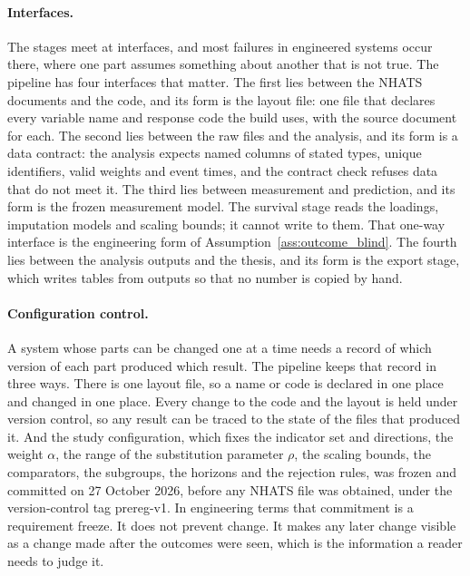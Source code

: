 \paragraph{Interfaces.} The stages meet at interfaces, and most failures in
engineered systems occur there, where one part assumes something about
another that is not true. The pipeline has four interfaces that matter. The
first lies between the NHATS documents and the code, and its form is the
layout file: one file that declares every variable name and response code the
build uses, with the source document for each. The second lies between the
raw files and the analysis, and its form is a data contract: the analysis
expects named columns of stated types, unique identifiers, valid weights and
event times, and the contract check refuses data that do not meet it. The
third lies between measurement and prediction, and its form is the frozen
measurement model. The survival stage reads the loadings, imputation models
and scaling bounds; it cannot write to them. That one-way interface is the
engineering form of Assumption~\ref{ass:outcome_blind}. The fourth lies
between the analysis outputs and the thesis, and its form is the export
stage, which writes tables from outputs so that no number is copied by hand.

\paragraph{Configuration control.} A system whose parts can be changed one at
a time needs a record of which version of each part produced which result.
The pipeline keeps that record in three ways. There is one layout file, so a
name or code is declared in one place and changed in one place. Every change
to the code and the layout is held under version control, so any result can
be traced to the state of the files that produced it. And the study
configuration, which fixes the indicator set and directions, the weight
$\alpha$, the range of the substitution parameter $\rho$, the scaling bounds,
the comparators, the subgroups, the horizons and the rejection rules, was
frozen and committed on 27 October 2026, before any NHATS file was obtained,
under the version-control tag prereg-v1. In engineering terms that
commitment is a requirement freeze. It does not prevent change. It makes any
later change visible as a change made after the outcomes were seen, which is
the information a reader needs to judge it.

